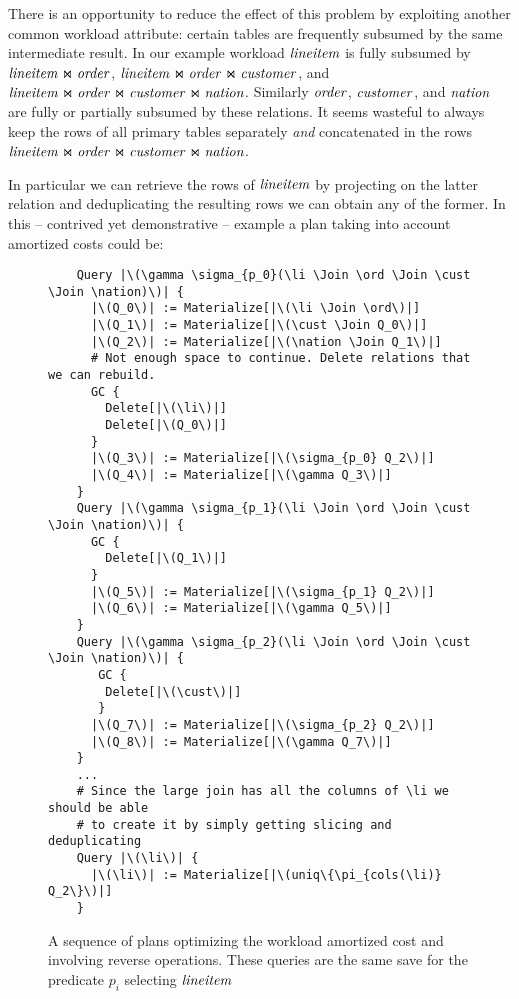 There is an opportunity to reduce the effect of this problem by
exploiting another common workload attribute: certain tables are
frequently subsumed by the same intermediate result. In our example
workload \(\mathit{lineitem}\) is fully subsumed by \(\mathit{lineitem} \Join \mathit{order}\), \(\mathit{lineitem} \Join
\mathit{order} \Join \mathit{customer}\), and \(\mathit{lineitem} \Join \mathit{order} \Join \mathit{customer} \Join
\mathit{nation}\). Similarly \(\mathit{order}\), \(\mathit{customer}\), and \(\mathit{nation}\) are fully or
partially subsumed by these relations. It seems wasteful to always
keep the rows of all primary tables separately \emph{and} concatenated
in the rows \(\mathit{lineitem} \Join \mathit{order} \Join \mathit{customer} \Join \mathit{nation}\).

In particular we can retrieve the rows of \(\mathit{lineitem}\) by projecting
on the latter relation and deduplicating the resulting rows we can
obtain any of the former. In this -- contrived yet demonstrative --
example a plan taking into account amortized costs could be:

\begin{figure}[H]
\begin{verbatim}
    Query |\(\gamma \sigma_{p_0}(\li \Join \ord \Join \cust \Join \nation)\)| {
      |\(Q_0\)| := Materialize[|\(\li \Join \ord\)|]
      |\(Q_1\)| := Materialize[|\(\cust \Join Q_0\)|]
      |\(Q_2\)| := Materialize[|\(\nation \Join Q_1\)|]
      # Not enough space to continue. Delete relations that we can rebuild.
      GC {
        Delete[|\(\li\)|]
        Delete[|\(Q_0\)|]
      }
      |\(Q_3\)| := Materialize[|\(\sigma_{p_0} Q_2\)|]
      |\(Q_4\)| := Materialize[|\(\gamma Q_3\)|]
    }
    Query |\(\gamma \sigma_{p_1}(\li \Join \ord \Join \cust \Join \nation)\)| {
      GC {
        Delete[|\(Q_1\)|]
      }
      |\(Q_5\)| := Materialize[|\(\sigma_{p_1} Q_2\)|]
      |\(Q_6\)| := Materialize[|\(\gamma Q_5\)|]
    }
    Query |\(\gamma \sigma_{p_2}(\li \Join \ord \Join \cust \Join \nation)\)| {
       GC {
        Delete[|\(\cust\)|]
       }
      |\(Q_7\)| := Materialize[|\(\sigma_{p_2} Q_2\)|]
      |\(Q_8\)| := Materialize[|\(\gamma Q_7\)|]
    }
    ...
    # Since the large join has all the columns of \li we should be able
    # to create it by simply getting slicing and deduplicating
    Query |\(\li\)| {
      |\(\li\)| := Materialize[|\(uniq\{\pi_{cols(\li)} Q_2\}\)|]
    }
\end{verbatim}
  \caption{\label{fig:amortized_plan}A sequence of plans optimizing
    the workload amortized cost and involving reverse
    operations. These queries are the same save for the predicate
    \(p_i\) selecting \(\mathit{lineitem}\)}
\end{figure}

